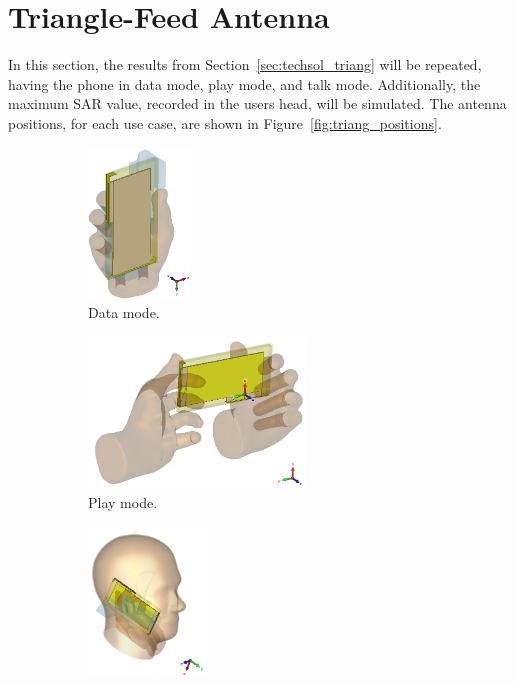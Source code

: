 \section{Triangle-Feed Antenna}
In this section, the results from Section~\ref{sec:techsol_triang} will be repeated, having the phone in data mode, play mode, and talk mode. Additionally, the maximum SAR value, recorded in the users head, will be simulated. The antenna positions, for each use case, are shown in Figure~\ref{fig:triang_positions}.

\begin{figure}[htbp]
    \centering
    \begin{subfigure}[b]{0.24\linewidth}
        \centering
        \includegraphics[width=\linewidth,height=4cm,keepaspectratio]{img/tech_sol/trianglefeed/data_mode/3d.PNG}
        \caption{Data mode.}
    \end{subfigure}
    \begin{subfigure}[b]{0.24\linewidth}
        \centering
        \includegraphics[width=\linewidth,height=4cm,keepaspectratio]{img/tech_sol/trianglefeed/play_mode/3d.PNG}
        \caption{Play mode.}
    \end{subfigure}
    \begin{subfigure}[b]{0.24\linewidth}
        \centering
        \includegraphics[width=\linewidth,height=4cm,keepaspectratio]{img/tech_sol/trianglefeed/talk_mode/3d.PNG}

\end{subfigure}
\end{figure}
